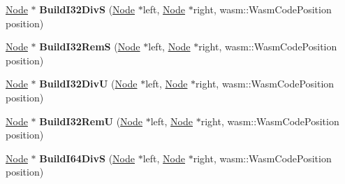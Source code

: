 \begin{DoxyCompactItemize}
\item 
\hyperlink{classv8_1_1internal_1_1compiler_1_1_node}{Node} $\ast$ {\bfseries Build\+I32\+DivS} (\hyperlink{classv8_1_1internal_1_1compiler_1_1_node}{Node} $\ast$left, \hyperlink{classv8_1_1internal_1_1compiler_1_1_node}{Node} $\ast$right, wasm\+::\+Wasm\+Code\+Position position)\hypertarget{classv8_1_1internal_1_1compiler_1_1_wasm_graph_builder_abd51450e8e0cea71c51f7d70d1c9a59d}{}\label{classv8_1_1internal_1_1compiler_1_1_wasm_graph_builder_abd51450e8e0cea71c51f7d70d1c9a59d}

\item 
\hyperlink{classv8_1_1internal_1_1compiler_1_1_node}{Node} $\ast$ {\bfseries Build\+I32\+RemS} (\hyperlink{classv8_1_1internal_1_1compiler_1_1_node}{Node} $\ast$left, \hyperlink{classv8_1_1internal_1_1compiler_1_1_node}{Node} $\ast$right, wasm\+::\+Wasm\+Code\+Position position)\hypertarget{classv8_1_1internal_1_1compiler_1_1_wasm_graph_builder_a9440bfcb18fee2c3fae9bb3cb9b79e7f}{}\label{classv8_1_1internal_1_1compiler_1_1_wasm_graph_builder_a9440bfcb18fee2c3fae9bb3cb9b79e7f}

\item 
\hyperlink{classv8_1_1internal_1_1compiler_1_1_node}{Node} $\ast$ {\bfseries Build\+I32\+DivU} (\hyperlink{classv8_1_1internal_1_1compiler_1_1_node}{Node} $\ast$left, \hyperlink{classv8_1_1internal_1_1compiler_1_1_node}{Node} $\ast$right, wasm\+::\+Wasm\+Code\+Position position)\hypertarget{classv8_1_1internal_1_1compiler_1_1_wasm_graph_builder_a190359a57606a3bb8e15a946daa04c66}{}\label{classv8_1_1internal_1_1compiler_1_1_wasm_graph_builder_a190359a57606a3bb8e15a946daa04c66}

\item 
\hyperlink{classv8_1_1internal_1_1compiler_1_1_node}{Node} $\ast$ {\bfseries Build\+I32\+RemU} (\hyperlink{classv8_1_1internal_1_1compiler_1_1_node}{Node} $\ast$left, \hyperlink{classv8_1_1internal_1_1compiler_1_1_node}{Node} $\ast$right, wasm\+::\+Wasm\+Code\+Position position)\hypertarget{classv8_1_1internal_1_1compiler_1_1_wasm_graph_builder_a900157915da9157a2138191f956c902f}{}\label{classv8_1_1internal_1_1compiler_1_1_wasm_graph_builder_a900157915da9157a2138191f956c902f}

\item 
\hyperlink{classv8_1_1internal_1_1compiler_1_1_node}{Node} $\ast$ {\bfseries Build\+I64\+DivS} (\hyperlink{classv8_1_1internal_1_1compiler_1_1_node}{Node} $\ast$left, \hyperlink{classv8_1_1internal_1_1compiler_1_1_node}{Node} $\ast$right, wasm\+::\+Wasm\+Code\+Position position)\hypertarget{classv8_1_1internal_1_1compiler_1_1_wasm_graph_builder_af316ec0ef649947df56092bb6df60c09}{}\label{classv8_1_1internal_1_1compiler_1_1_wasm_graph_builder_af316ec0ef649947df56092bb6df60c09}


\end{DoxyCompactItemize}
